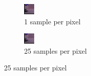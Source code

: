 \begin{figure}[h]
\centering
\begin{subfigure}[b]{0.4\textwidth}
	\includegraphics[width=\textwidth]{./images/renders/no-aa.png}
	\caption{1 sample per pixel}
\end{subfigure}
\begin{subfigure}[b]{0.4\textwidth}
	\includegraphics[width=\textwidth]{./images/renders/aa.png}
	\caption{25 samples per pixel}
\end{subfigure}
\end{figure}

